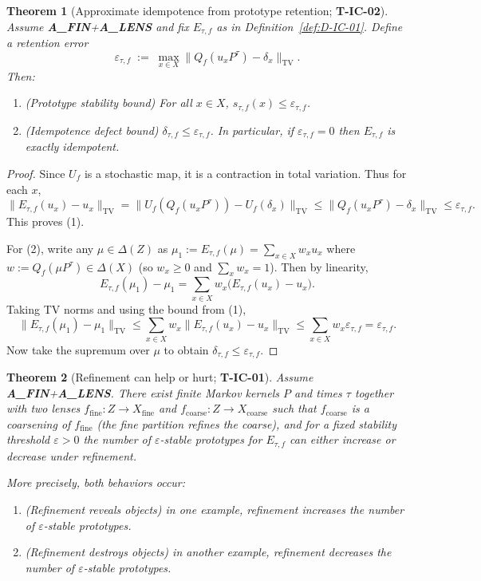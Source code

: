 \documentclass[11pt]{article}
\newtheorem{theorem}{Theorem}
\theoremstyle{remark}
\begin{document}
\begin{theorem}[Approximate idempotence from prototype retention; \textbf{T-IC-02}]
\label{thm:T-IC-02}
Assume \textbf{A\_FIN}+\textbf{A\_LENS} and fix $E_{\tau,f}$ as in Definition~\ref{def:D-IC-01}.
Define a \emph{retention error}
\[
\varepsilon_{\tau,f}
\;:=\;
\max_{x\in X}\bigl\|Q_f(u_xP^\tau)-\delta_x\bigr\|_{\mathrm{TV}}.
\]
Then:
\begin{enumerate}
\item (Prototype stability bound) For all $x\in X$, $s_{\tau,f}(x)\le \varepsilon_{\tau,f}$.
\item (Idempotence defect bound) $\delta_{\tau,f}\le \varepsilon_{\tau,f}$.
In particular, if $\varepsilon_{\tau,f}=0$ then $E_{\tau,f}$ is exactly idempotent.
\end{enumerate}
\end{theorem}

\begin{proof}
Since $U_f$ is a stochastic map, it is a contraction in total variation.
Thus for each $x$,
\[
\|E_{\tau,f}(u_x)-u_x\|_{\mathrm{TV}}
=
\|U_f(Q_f(u_xP^\tau)) - U_f(\delta_x)\|_{\mathrm{TV}}
\le
\|Q_f(u_xP^\tau)-\delta_x\|_{\mathrm{TV}}
\le \varepsilon_{\tau,f}.
\]
This proves (1).

For (2), write any $\mu\in\Delta(Z)$ as $\mu_1:=E_{\tau,f}(\mu)=\sum_{x\in X}w_x u_x$
where $w:=Q_f(\mu P^\tau)\in \Delta(X)$ (so $w_x\ge 0$ and $\sum_x w_x=1$).
Then by linearity,
\[
E_{\tau,f}(\mu_1) - \mu_1
=
\sum_{x\in X} w_x\bigl(E_{\tau,f}(u_x)-u_x\bigr).
\]
Taking TV norms and using the bound from (1),
\[
\|E_{\tau,f}(\mu_1) - \mu_1\|_{\mathrm{TV}}
\le
\sum_{x\in X}w_x \|E_{\tau,f}(u_x)-u_x\|_{\mathrm{TV}}
\le
\sum_{x\in X}w_x \varepsilon_{\tau,f}
=
\varepsilon_{\tau,f}.
\]
Now take the supremum over $\mu$ to obtain $\delta_{\tau,f}\le \varepsilon_{\tau,f}$.
\end{proof}

\begin{theorem}[Refinement can help or hurt; \textbf{T-IC-01}]
\label{thm:T-IC-01}
Assume \textbf{A\_FIN}+\textbf{A\_LENS}.
There exist finite Markov kernels $P$ and times $\tau$ together with two lenses
$f_{\mathrm{fine}}:Z\to X_{\mathrm{fine}}$ and $f_{\mathrm{coarse}}:Z\to X_{\mathrm{coarse}}$
such that $f_{\mathrm{coarse}}$ is a coarsening of $f_{\mathrm{fine}}$ (the fine partition refines the coarse),
and for a fixed stability threshold $\varepsilon>0$ the number of $\varepsilon$-stable prototypes
for $E_{\tau,f}$ can either increase or decrease under refinement.

More precisely, both behaviors occur:
\begin{enumerate}
\item (\emph{Refinement reveals objects}) in one example, refinement increases the number of
$\varepsilon$-stable prototypes.
\item (\emph{Refinement destroys objects}) in another example, refinement decreases the number of
$\varepsilon$-stable prototypes.
\end{enumerate}
\end{theorem}
\end{document}
